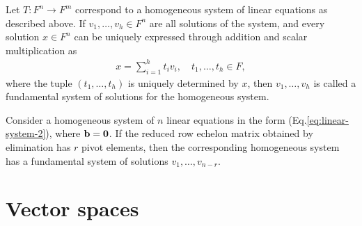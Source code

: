 \begin{definition}
  Let $T: F^n \rightarrow F^m$ correspond to a homogeneous system of linear equations as described above. If $v_1, \ldots, v_h \in F^n$ are all solutions of the system, and every solution $x \in F^n$ can be uniquely expressed through addition and scalar multiplication as
  \begin{align}
    x = \sum_{i=1}^h t_i v_i, \quad t_1, \ldots, t_h \in F,
  \end{align}
  where the tuple $(t_1, \ldots, t_h)$ is uniquely determined by $x$, then $v_1, \ldots, v_h$ is called a fundamental system of solutions for the homogeneous system.
\end{definition}

\begin{proposition}
  Consider a homogeneous system of $n$ linear equations in the form (Eq.\ref{eq:linear-system-2}), where $\bf{b} = 0$. If the reduced row echelon matrix obtained by elimination has $r$ pivot elements, then the corresponding homogeneous system has a fundamental system of solutions $v_1, \ldots, v_{n-r}$.
\end{proposition}

\section{Vector spaces}

